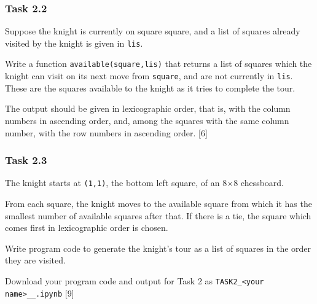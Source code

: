 \subsubsection*{Task 2.2}

Suppose the knight is currently on square square, and a list of squares
already visited by the knight is given in \texttt{lis}.

Write a function \texttt{available(square,lis)} that returns a list
of squares which the knight can visit on its next move from \texttt{square},
and are not currently in \texttt{lis}. These are the squares available
to the knight as it tries to complete the tour.

The output should be given in lexicographic order, that is, with the
column numbers in ascending order, and, among the squares with the
same column number, with the row numbers in ascending order. \hfill{}{[}6{]}

\subsubsection*{Task 2.3}

The knight starts at \texttt{(1,1)}, the bottom left square, of an
$8\mathtt{\times}8$ chessboard.

From each square, the knight moves to the available square from which
it has the smallest number of available squares after that. If there
is a tie, the square which comes first in lexicographic order is chosen.

Write program code to generate the knight\textquoteright s tour as
a list of squares in the order they are visited.

Download your program code and output for Task 2 as \texttt{TASK2\_<your
name>\_<centre number>\_<index number>.ipynb}\hfill{} {[}9{]}
